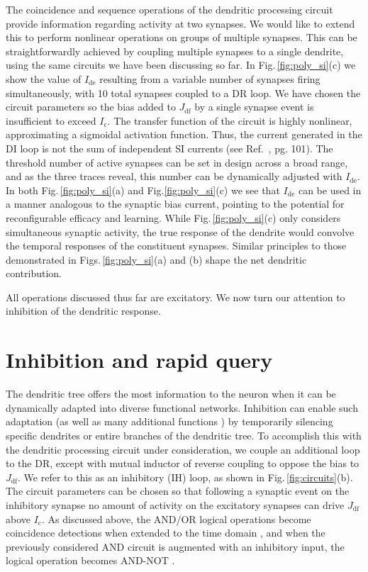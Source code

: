 \documentclass[twocolumn]{article}
\newcommand{\onlinecite}[1]{\hspace{-1 ex} \nocite{#1}\citenum{#1}}
\begin{document}
The coincidence and sequence operations of the dendritic processing circuit provide information regarding activity at two synapses. We would like to extend this to perform nonlinear operations on groups of multiple synapses. This can be straightforwardly achieved by coupling multiple synapses to a single dendrite, using the same circuits we have been discussing so far. In Fig.\,\ref{fig:poly_si}(c) we show the value of $I_{\mathrm{de}}$ resulting from a variable number of synapses firing simultaneously, with 10 total synapses coupled to a DR loop. We have chosen the circuit parameters so the bias added to $J_{\mathrm{df}}$ by a single synapse event is insufficient to exceed $I_{\mathrm{c}}$. The transfer function of the circuit is highly nonlinear, approximating a sigmoidal activation function. Thus, the current generated in the DI loop is not the sum of independent SI currents (see Ref.\,\onlinecite{geki2002}, pg. 101). The threshold number of active synapses can be set in design across a broad range, and as the three traces reveal, this number can be dynamically adjusted with $I_{\mathrm{de}}$. In both Fig.\,\ref{fig:poly_si}(a) and Fig.\ref{fig:poly_si}(c) we see that $I_{\mathrm{de}}$ can be used in a manner analogous to the synaptic bias current, pointing to the potential for reconfigurable efficacy and learning. While Fig.\,\ref{fig:poly_si}(c) only considers simultaneous synaptic activity, the true response of the dendrite would convolve the temporal responses of the constituent synapses. Similar principles to those demonstrated in Figs.\,\ref{fig:poly_si}(a) and (b) shape the net dendritic contribution.

All operations discussed thus far are excitatory. We now turn our attention to inhibition of the dendritic response.

\section{\label{sec:inhibition_and_rapid_query}Inhibition and rapid query}
The dendritic tree offers the most information to the neuron when it can be dynamically adapted into diverse functional networks. Inhibition can enable such adaptation (as well as many additional functions \cite{robu2015}) by temporarily silencing specific dendrites or entire branches of the dendritic tree. To accomplish this with the dendritic processing circuit under consideration, we couple an additional loop to the DR, except with mutual inductor of reverse coupling to oppose the bias to $J_{\mathrm{df}}$. We refer to this as an inhibitory (IH) loop, as shown in Fig.\,\ref{fig:circuits}(b). The circuit parameters can be chosen so that following a synaptic event on the inhibitory synapse no amount of activity on the excitatory synapses can drive $J_{\mathrm{df}}$ above $I_{\mathrm{c}}$. As discussed above, the AND/OR logical operations become coincidence detections when extended to the time domain \cite{stsp2015}, and when the previously considered AND circuit is augmented with an inhibitory input, the logical operation becomes AND-NOT \cite{stsp2015}.  
\end{document}
